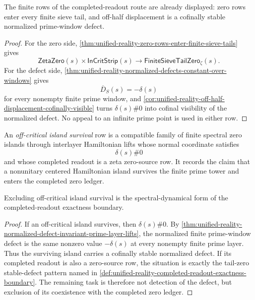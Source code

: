 \begin{theorem}
\label{thm:unified-reality-finite-rows-completed-readout-route-closed}
The finite rows of the completed-readout route are already displayed:
zero rows enter every finite sieve tail, and off-half displacement is a
cofinally stable normalized prime-window defect.
\end{theorem}

\begin{proof}
For the zero side,
\autoref{thm:unified-reality-zero-rows-enter-finite-sieve-tails} gives
$$
\mathsf{ZetaZero}(s)\times\mathsf{InCritStrip}(s)
\to
\mathsf{FiniteSieveTailZero}_{\zeta}(s).
$$
For the defect side,
\autoref{thm:unified-reality-normalized-defects-constant-over-windows}
gives
$$
\overline D_S(s)=-\delta(s)
$$
for every nonempty finite prime window, and
\autoref{cor:unified-reality-off-half-displacement-cofinally-visible}
turns $\delta(s)\#0$ into cofinal visibility of the normalized defect.
No appeal to an infinite prime point is used in either row.
\end{proof}

\begin{definition}
\label{def:unified-reality-off-critical-island-survival}
An \emph{off-critical island survival} row is a compatible family of
finite spectral zero islands through interlayer Hamiltonian lifts whose
normal coordinate satisfies
$$
\delta(s)\#0
$$
and whose completed readout is a zeta zero-source row.  It records the
claim that a nonunitary centered Hamiltonian island survives the finite
prime tower and enters the completed zero ledger.
\end{definition}

\begin{theorem}
\label{thm:unified-reality-off-critical-island-survival-stable-defect-boundary}
Excluding off-critical island survival is the spectral-dynamical form of
the completed-readout exactness boundary.
\end{theorem}

\begin{proof}
If an off-critical island survives, then $\delta(s)\#0$.  By
\autoref{thm:unified-reality-normalized-defect-invariant-prime-layer-lifts},
the normalized finite prime-window defect is the same nonzero value
$-\delta(s)$ at every nonempty finite prime layer.  Thus the surviving
island carries a cofinally stable normalized defect.  If its completed
readout is also a zero-source row, the situation is exactly the
tail-zero stable-defect pattern named in
\autoref{def:unified-reality-completed-readout-exactness-boundary}.  The
remaining task is therefore not detection of the defect, but exclusion
of its coexistence with the completed zero ledger.
\end{proof}

